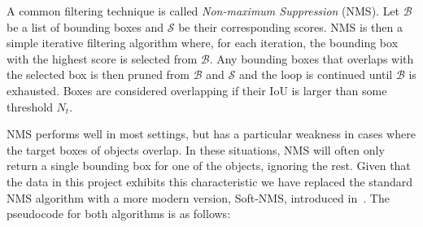 A common filtering technique is called \textit{Non-maximum Suppression} (NMS).
Let \( \mathcal{B} \) be a list of bounding boxes and \( \mathcal{S} \) be their corresponding scores.
NMS is then a simple iterative filtering algorithm where, for each iteration, the bounding box with the highest score is selected from \(\mathcal{B}\).
Any bounding boxes that overlaps with the selected box is then pruned from \(\mathcal{B}\) and \(\mathcal{S}\) and the loop is continued until \(\mathcal{B}\) is exhausted. Boxes are considered overlapping if their IoU is larger than some threshold \(N_t\).

NMS performs well in most settings, but has a particular weakness in cases where the target boxes of objects overlap.
In these situations, NMS will often only return a single bounding box for one of the objects, ignoring the rest.
Given that the data in this project exhibits this characteristic we have replaced the standard NMS algorithm with a more modern version, Soft-NMS, introduced in~\cite{bodla2017softnms}.
The pseudocode for both algorithms is as follows:
%
